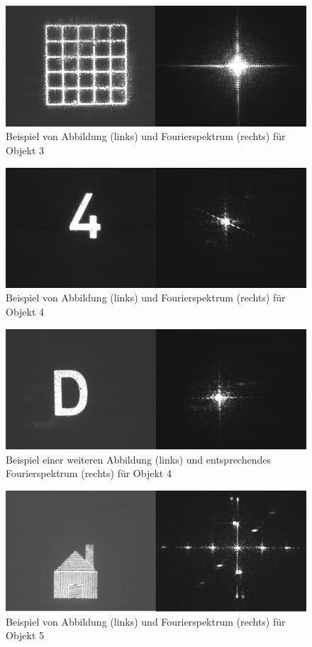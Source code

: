 \begin{figure}
\centering
\includegraphics[width=0.7\linewidth]{images/edit-xcf/example13}
\caption{Beispiel von Abbildung (links) und Fourierspektrum (rechts) für Objekt 3}
\label{fig:example13}
\end{figure}

\begin{figure}
\centering
\includegraphics[width=0.7\linewidth]{images/edit-xcf/example4}
\caption{Beispiel von Abbildung (links) und Fourierspektrum (rechts) für Objekt 4}
\label{fig:example4}
\end{figure}

\begin{figure}
\centering
\includegraphics[width=0.7\linewidth]{images/edit-xcf/example9}
\caption{Beispiel einer weiteren Abbildung (links) und entsprechendes Fourierspektrum (rechts) für Objekt 4}
\label{fig:example9}
\end{figure}

\begin{figure}
\centering
\includegraphics[width=0.7\linewidth]{images/edit-xcf/example16}
\caption{Beispiel von Abbildung (links) und Fourierspektrum (rechts) für Objekt 5}
\label{fig:example16}
\end{figure}


